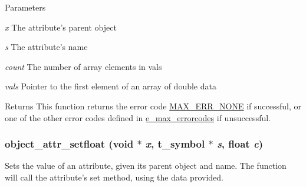\begin{DoxyParams}{Parameters}
\item[{\em x}]The attribute's parent object \item[{\em s}]The attribute's name \item[{\em count}]The number of array elements in vals \item[{\em vals}]Pointer to the first element of an array of double data\end{DoxyParams}
\begin{DoxyReturn}{Returns}
This function returns the error code \hyperlink{group__misc_gga0764dd6c02b76cca7d053ae50555d69da6d22f77fef8b1e1b074cef5d29d935fd}{MAX\_\-ERR\_\-NONE} if successful, or one of the other error codes defined in \hyperlink{group__misc_ga0764dd6c02b76cca7d053ae50555d69d}{e\_\-max\_\-errorcodes} if unsuccessful. 
\end{DoxyReturn}
\hypertarget{group__attr_ga40123049f1d45d92f55fc3038207595e}{
\subsubsection[{object\_\-attr\_\-setfloat}]{ object\_\-attr\_\-setfloat (void $\ast$ {\em x}, \/  {\bf t\_\-symbol} $\ast$ {\em s}, \/  float {\em c})}}
\label{group__attr_ga40123049f1d45d92f55fc3038207595e}


Sets the value of an attribute, given its parent object and name. The function will call the attribute's {\ttfamily set} method, using the data provided.


